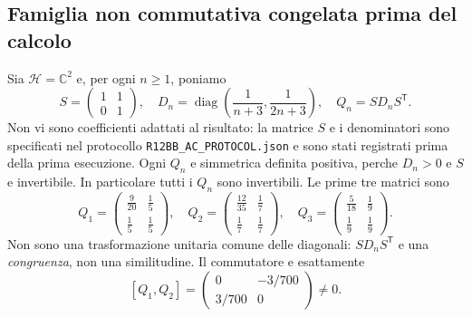 \documentclass[11pt,a4paper]{article}
\begin{document}
\subsection*{Famiglia non commutativa congelata prima del calcolo}
Sia $\mathcal H=\mathbb C^2$ e, per ogni $n\ge1$, poniamo
\begin{equation}
\boxed{S=\begin{pmatrix}1&1\\0&1\end{pmatrix},\quad
 D_n=\operatorname{diag}\!\left(\frac1{n+3},\frac1{2n+3}\right),\quad
 Q_n=SD_nS^{\mathsf T}.}\tag{AC.1}
\end{equation}
Non vi sono coefficienti adattati al risultato: la matrice $S$ e i denominatori sono specificati nel protocollo \texttt{R12BB\_AC\_PROTOCOL.json} e sono stati registrati prima della prima esecuzione. Ogni $Q_n$ e simmetrica definita positiva, perche $D_n>0$ e $S$ e invertibile. In particolare tutti i $Q_n$ sono invertibili. Le prime tre matrici sono
\begin{equation}
Q_1=\begin{pmatrix}\frac9{20}&\frac15\\[2pt]\frac15&\frac15\end{pmatrix},\quad
Q_2=\begin{pmatrix}\frac{12}{35}&\frac17\\[2pt]\frac17&\frac17\end{pmatrix},\quad
Q_3=\begin{pmatrix}\frac5{18}&\frac19\\[2pt]\frac19&\frac19\end{pmatrix}.\tag{AC.2}
\end{equation}
Non sono una trasformazione unitaria comune delle diagonali: $SD_nS^{\mathsf T}$ e una \emph{congruenza}, non una similitudine. Il commutatore e esattamente
\begin{equation}
\boxed{[Q_1,Q_2]=\begin{pmatrix}0&-3/700\\3/700&0\end{pmatrix}\ne0.}\tag{AC.3}
\end{equation}
\end{document}
